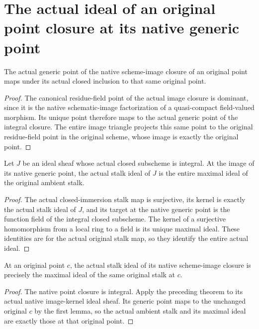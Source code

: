 \section{The actual ideal of an original point closure at its native generic point}
\begin{lemma}\label{lem:point-closure-inclusion-generic-point}
The actual generic point of the native scheme-image closure of an original point maps under its actual closed inclusion to that same original point.
\leanok
\end{lemma}
\begin{proof}
The canonical residue-field point of the actual image closure is dominant, since it is the native schematic-image factorization of a quasi-compact field-valued morphism. Its unique point therefore maps to the actual generic point of the integral closure. The entire image triangle projects this same point to the original residue-field point in the original scheme, whose image is exactly the original point.
\end{proof}
\begin{theorem}\label{thm:integral-closed-subscheme-generic-stalk-ideal}
Let $J$ be an ideal sheaf whose actual closed subscheme is integral. At the image of its native generic point, the actual stalk ideal of $J$ is the entire maximal ideal of the original ambient stalk.
\leanok
\end{theorem}
\begin{proof}
The actual closed-immersion stalk map is surjective, its kernel is exactly the actual stalk ideal of $J$, and its target at the native generic point is the function field of the integral closed subscheme. The kernel of a surjective homomorphism from a local ring to a field is its unique maximal ideal. These identities are for the actual original stalk map, so they identify the entire actual ideal.
\end{proof}
\begin{theorem}\label{thm:point-closure-original-stalk-maximal-ideal}
At an original point $c$, the actual stalk ideal of its native scheme-image closure is precisely the maximal ideal of the same original stalk at $c$.
\leanok
\end{theorem}
\begin{proof}
The native point closure is integral. Apply the preceding theorem to its actual native image-kernel ideal sheaf. Its generic point maps to the unchanged original $c$ by the first lemma, so the actual ambient stalk and its maximal ideal are exactly those at that original point.
\end{proof}
